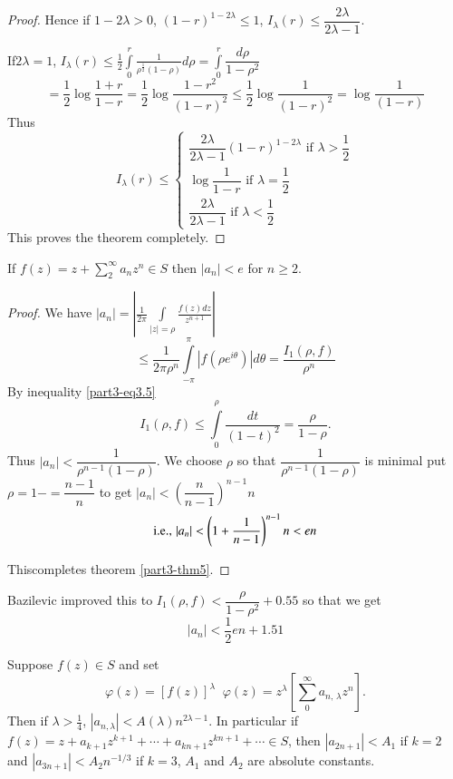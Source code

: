 \begin{proof}
Hence if $1-2\lambda>0$, $(1-r)^{1-2\lambda}\leq 1$,
$I_{\lambda}(r)\leq \dfrac{2\lambda}{2\lambda-1}$.

If\pageoriginale $2\lambda=1$, $I_{\lambda}(r)\leq
\frac{1}{2}\int\limits^{r}_{0}\frac{1}{\rho^{\frac{1}{2}}(1-\rho)}d\rho
=\int\limits^{r}_{0}\dfrac{d\rho}{1-\rho^{2}}$
$$
=\frac{1}{2}\log
\frac{1+r}{1-r}=\frac{1}{2}\log\frac{1-r^{2}}{(1-r)^{2}}\leq
\frac{1}{2}\log \frac{1}{(1-r)^{2}}=\log \frac{1}{(1-r)}
$$
Thus
$$
I_{\lambda}(r)\leq 
\begin{cases}
\dfrac{2\lambda}{2\lambda-1}(1-r)^{1-2\lambda} \text{ \ if \ }
\lambda>\dfrac{1}{2}\\
\log \dfrac{1}{1-r} \text{ \ if \ } \lambda=\dfrac{1}{2}\\
\dfrac{2\lambda}{2\lambda-1}\text{ \ if \ } \lambda<\dfrac{1}{2}
\end{cases}
$$
This proves the theorem completely.
\end{proof}

\begin{thm}[Littlewood]\label{part3-thm5}
If $f(z)=z+\sum\limits^{\infty}_{2}a_{n}z^{n}\in S$ then
$|a_{n}|<e$ for $n\geq 2$.
\end{thm}

\begin{proof}
We have $|a_{n}|=\left|\frac{1}{2\pi}\int\limits_{|z|=\rho}\frac{f(z)dz}{z^{n+1}}\right|$
$$
\leq \frac{1}{2\pi \rho^{n}}\int\limits^{\pi}_{-\pi}|f(\rho e^{i\theta})|d\theta=\frac{I_{1}(\rho,f)}{\rho^{n}}
$$
By inequality \eqref{part3-eq3.5}
$$
I_{1}(\rho,f)\leq \int\limits^{\rho}_{0}\frac{dt}{(1-t)^{2}}=\frac{\rho}{1-\rho}. 
$$
Thus $|a_{n}|<\dfrac{1}{\rho^{n-1}(1-\rho)}$. We choose $\rho$ so that
$\dfrac{1}{\rho^{n-1}(1-\rho)}$ is minimal \ie put
$\rho=1-=\dfrac{n-1}{n}$ to get
$|a_{n}|<\left(\dfrac{n}{n-1}\right)^{n-1}n$  
$$
\text{{i.e.,}\kern.3em} |a_{n}|<\left(1+\frac{1}{n-1}\right)^{n-1}n<en
$$

This\pageoriginale completes theorem \ref{part3-thm5}.
\end{proof}

\begin{remark*}
Bazilevic \cite{1} improved this to $I_{1}(\rho,f)<\dfrac{\rho}{1-\rho^{2}}+0.55$ so that we get
$$
|a_{n}|<\frac{1}{2}en+1.51
$$
\end{remark*}

\begin{thm}\label{part3-thm6}
Suppose $f(z)\in S$ and set
$$\varphi(z)=[f(z)]^{\lambda} \;\; \varphi(z) =
z^{\lambda}\left[\sum\limits^{\infty}_{0} a_{n, \,\lambda}z^{n}\right].$$ 
Then if $\lambda>\frac{1}{4}$,
$|a_{n,\lambda}|<A(\lambda)n^{2\lambda-1}$. In particular if
$f(z)=z+a_{k+1}z^{k+1}+\cdots+a_{kn+1}z^{kn+1}+\cdots\in S$, then
$|a_{2n+1}|<A_{1}$ if $k=2$ and $|a_{3n+1}|<A_{2}n^{-1/3}$ if $k=3$,
$A_{1}$ and $A_{2}$ are absolute constants. 
\end{thm}

